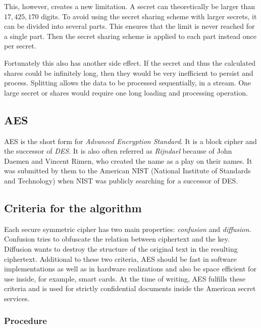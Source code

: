 This, however, creates a new limitation. A secret can theoretically be larger
than $17,425,170$ digits. To avoid using the secret sharing scheme with larger
secrets, it can be divided into several parts. This ensures that the limit
is never reached for a single part. Then the secret sharing scheme is applied to
each part instead once per secret.

Fortunately this also has another side effect. If the secret and thus the
calculated shares could be infinitely long, then they would be very inefficient
to persist and process. Splitting allows the data to be processed sequentially,
in a stream. One large secret or shares would require one long loading and
processing operation.

\subsection{AES}

AES is the short form for \textit{Advanced Encryption Standard}. It is a block cipher
and the successor of \textit{DES}. It is also often referred as \textit{Rijndael}
because of John Daemen and Vincent Rimen, who created the name as a play on their
names. It was submitted by them to the American NIST (National Institute of
Standards and Technology) when NIST was publicly searching for a successor of
DES.

\subsection{Criteria for the algorithm}

Each secure symmetric cipher has two main properties:
\textit{confusion} and \textit{diffusion}. Confusion tries to obfuscate
the relation between ciphertext and the key. Diffusion wants to
destroy the structure of the original text in the resulting ciphertext.
Additional to these two criteria, AES should be fast in software implementations
as well as in hardware realizations and also be space efficient for use
inside, for example, smart cards. At the time of writing, AES fulfills these
criteria and is used for strictly confidential documents inside the American
secret services.

\subsubsection{Procedure}

